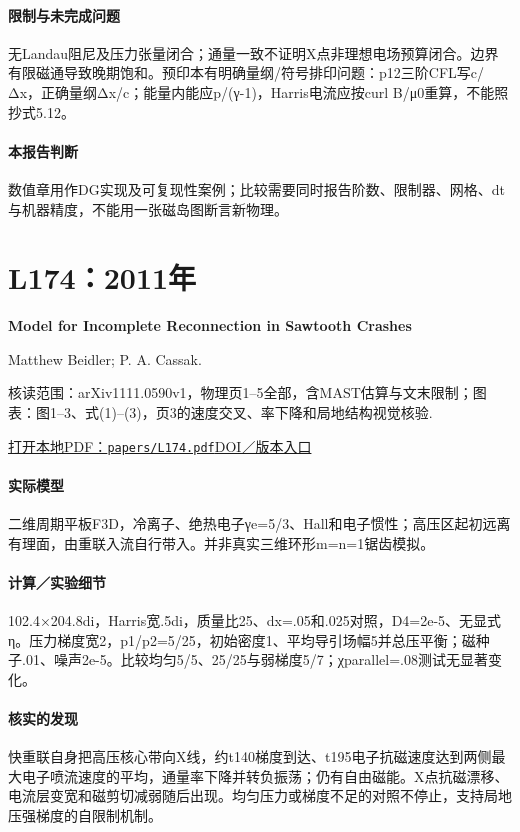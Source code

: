 \paragraph{限制与未完成问题}无Landau阻尼及压力张量闭合；通量一致不证明X点非理想电场预算闭合。边界有限磁通导致晚期饱和。预印本有明确量纲/符号排印问题：p12三阶CFL写c/Δx，正确量纲Δx/c；能量内能应p/(γ-1)，Harris电流应按curl B/μ0重算，不能照抄式5.12。

\paragraph{本报告判断}数值章用作DG实现及可复现性案例；比较需要同时报告阶数、限制器、网格、dt与机器精度，不能用一张磁岛图断言新物理。

\section{L174：2011年}\label{paper:L174}

\textbf{Model for Incomplete Reconnection in Sawtooth Crashes}\citep{L174}\

Matthew Beidler;  P. A. Cassak.

\textsf{核读范围：}arXiv1111.0590v1，物理页1–5全部，含MAST估算与文末限制；\textsf{图表：}图1–3、式(1)–(3)，页3的速度交叉、率下降和局地结构视觉核验.

\href{run:papers/L174.pdf}{打开本地PDF：\texttt{papers/L174.pdf}}\quad\href{https://doi.org/10.1103/physrevlett.107.255002}{DOI／版本入口}

\paragraph{实际模型}二维周期平板F3D，冷离子、绝热电子γe=5/3、Hall和电子惯性；高压区起初远离有理面，由重联入流自行带入。并非真实三维环形m=n=1锯齿模拟。

\paragraph{计算／实验细节}102.4×204.8di，Harris宽.5di，质量比25、dx=.05和.025对照，D4=2e-5、无显式η。压力梯度宽2，p1/p2=5/25，初始密度1、平均导引场幅5并总压平衡；磁种子.01、噪声2e-5。比较均匀5/5、25/25与弱梯度5/7；χparallel=.08测试无显著变化。

\paragraph{核实的发现}快重联自身把高压核心带向X线，约t140梯度到达、t195电子抗磁速度达到两侧最大电子喷流速度的平均，通量率下降并转负振荡；仍有自由磁能。X点抗磁漂移、电流层变宽和磁剪切减弱随后出现。均匀压力或梯度不足的对照不停止，支持局地压强梯度的自限制机制。

